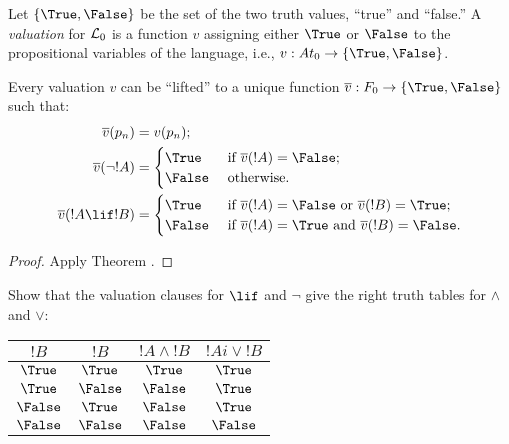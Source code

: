 \documentclass[../../include/open-logic-section]{subfiles}
\begin{document}


\begin{defn}[Valuations] Let $\{\True,\False\}$ be the set of the two truth
values, ``true'' and ``false.'' A \emph{valuation} for $\mathcal L_0$ is a
function $v$ assigning either $\True$ or $\False$ to the propositional
variables of the language, i.e., $v : At_0 \to\{\True,\False \}$.
\end{defn}

\begin{thm} Every valuation $v$ can be ``lifted'' to a unique function
$\overline{v} : F_0 \to \{\True,\False \}$ such that: \begin{align*}
\overline{v}(p_n) & = v(p_n); \\ \overline{v}(\lnot !A) & = \begin{cases}
\True & \text{ if } \overline{v}(!A) = \False;\\ \False & \text{
otherwise.} \end{cases} \\ \overline{v}(!A \lif !B) &= \begin{cases} \True
& \text{ if $\overline{v}(!A) = \False$ or $\overline{v}(!B) = \True$;}\\
\False & \text{ if $\overline{v}(!A) = \True$ and $\overline{v}(!B) =
\False$}. \end{cases} \end{align*} \end{thm}

\begin{proof} Apply Theorem . \end{proof}
\begin{prob} Show that the valuation clauses for $\lif$ and $\lnot$ give
the right truth tables for $\land$ and $\lor$: \begin{center}
\begin{tabular}{|cc||c|c|} \hline $!B$ & $!B$ & $!A \land !B$ & $!Ai \lor
!B$ \\ \hline \hline $\True$ & $\True$ & $\True$ & $\True$ \\ $\True$ &
$\False$ & $\False$ & $\True$ \\ $\False$ & $\True$ & $\False$ & $\True$ \\
$\False$ & $\False$ & $\False$ & $\False$ \\ \hline \end{tabular}
\end{center} \end{prob}
\end{document}
